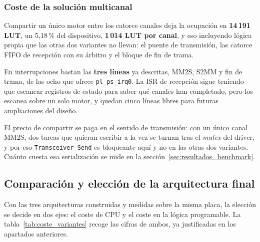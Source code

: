 \subsubsection{Coste de la solución multicanal}

Compartir un único motor entre los catorce canales deja la ocupación en \textbf{14\,191 LUT}, un
5,18\,\% del dispositivo, \textbf{1\,014 LUT por canal}, y eso incluyendo lógica propia que las
otras dos variantes no llevan: el puente de transmisión, las catorce FIFO de recepción con su
árbitro y el bloque de fin de trama.

En interrupciones bastan las \textbf{tres líneas} ya descritas, MM2S, S2MM y fin de trama, de las
ocho que ofrece \texttt{pl\_ps\_irq0}. La ISR de recepción sigue teniendo que escanear registros de
estado para saber qué canales han completado, pero los escanea sobre un solo motor, y quedan cinco
líneas libres para futuras ampliaciones del diseño.

El precio de compartir se paga en el sentido de transmisión: con un único canal MM2S, dos tareas
que quieran escribir a la vez se turnan tras el \textit{mutex} del driver, y por eso
\texttt{Transceiver\_Send} es bloqueante aquí y no en las otras dos variantes. Cuánto cuesta esa
serialización se mide en la sección~\ref{sec:resultados_benchmark}.

\subsection{Comparación y elección de la arquitectura final}

Con las tres arquitecturas construidas y medidas sobre la misma placa, la elección se decide en
dos ejes: el coste de CPU y el coste en la lógica programable. La tabla~\ref{tab:coste_variantes}
recoge las cifras de ambos, ya justificadas en los apartados anteriores.

